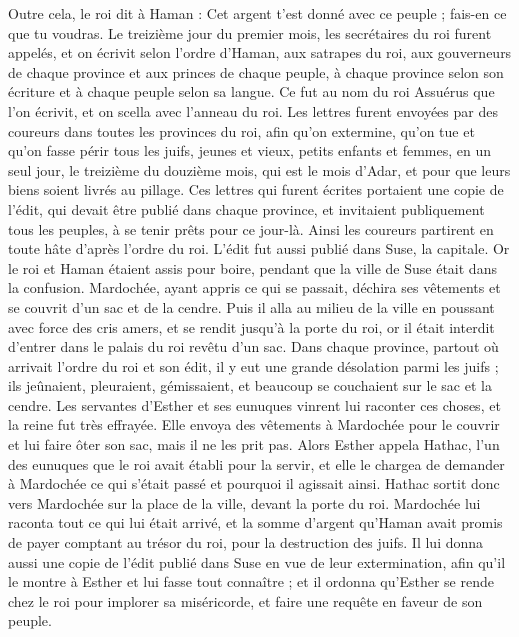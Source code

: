 \begin{multicols}{2}
Outre cela, le roi dit à Haman : Cet argent t'est donné avec ce peuple ; fais-en ce que tu voudras.
Le treizième jour du premier mois, les secrétaires du roi furent appelés, et on écrivit selon l’ordre d'Haman, aux satrapes du roi, aux gouverneurs de chaque province et aux princes de chaque peuple, à chaque province selon son écriture et à chaque peuple selon sa langue. Ce fut au nom du roi Assuérus que l’on écrivit, et on scella avec l'anneau du roi.
Les lettres furent envoyées par des coureurs dans toutes les provinces du roi, afin qu'on extermine, qu’on tue et qu’on fasse périr tous les juifs, jeunes et vieux, petits enfants et femmes, en un seul jour, le treizième du douzième mois, qui est le mois d'Adar, et pour que leurs biens soient livrés au pillage.
Ces lettres qui furent écrites portaient une copie de l’édit, qui devait être publié dans chaque province, et invitaient publiquement tous les peuples, à se tenir prêts pour ce jour-là.
Ainsi les coureurs partirent en toute hâte d’après l’ordre du roi. L'édit fut aussi publié dans Suse, la capitale. Or le roi et Haman étaient assis pour boire, pendant que la ville de Suse était dans la confusion.
\VerseOne{}Mardochée, ayant appris ce qui se passait, déchira ses vêtements et se couvrit d'un sac et de la cendre. Puis il alla au milieu de la ville en poussant avec force des cris amers,
et se rendit jusqu'à la porte du roi, or il était interdit d'entrer dans le palais du roi revêtu d'un sac.
Dans chaque province, partout où arrivait l’ordre du roi et son édit, il y eut une grande désolation parmi les juifs ; ils jeûnaient, pleuraient, gémissaient, et beaucoup se couchaient sur le sac et la cendre.
Les servantes d'Esther et ses eunuques vinrent lui raconter ces choses, et la reine fut très effrayée. Elle envoya des vêtements à Mardochée pour le couvrir et lui faire ôter son sac, mais il ne les prit pas.
Alors Esther appela Hathac, l'un des eunuques que le roi avait établi pour la servir, et elle le chargea de demander à Mardochée ce qui s’était passé et pourquoi il agissait ainsi.
Hathac sortit donc vers Mardochée sur la place de la ville, devant la porte du roi.
Mardochée lui raconta tout ce qui lui était arrivé, et la somme d'argent qu'Haman avait promis de payer comptant au trésor du roi, pour la destruction des juifs.
Il lui donna aussi une copie de l'édit publié dans Suse en vue de leur extermination, afin qu’il le montre à Esther et lui fasse tout connaître ; et il ordonna qu’Esther se rende chez le roi pour implorer sa miséricorde, et faire une requête en faveur de son peuple.

\end{multicols}
